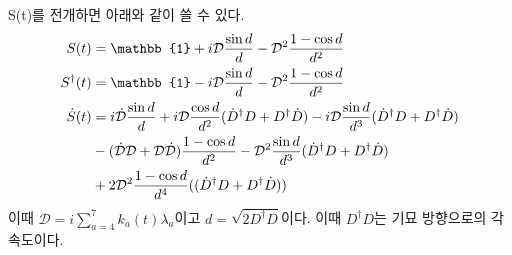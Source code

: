 \documentclass[superscriptaddress,
nofootinbib,byrevtex,fleqn,prd,12pt]{revtex4}
\begin{document}
S(t)를 전개하면 아래와 같이 쓸 수 있다.
\begin{align}
  S(t) & = \mathbb{1}+i\mathcal{D}\frac{\sin{d}}{d}-\mathcal{D}^2\frac{1-\cos{d}}{d^2} \label{eq:expansionS}\\
S^\dagger(t)& = \mathbb{1}-i\mathcal{D}\frac{\sin{d}}{d}-\mathcal{D}^2\frac{1-\cos{d}}{d^2}\label{eq:expationSD}\\
\dot{S}(t) &= i\dot{\mathcal{D}}\frac{\sin{d}}{d}+i\mathcal{D}\frac{\cos{d}}{d^2}(\dot{D}^\dagger D
+D^\dagger\dot{D})-i\mathcal{D}\frac{\sin{d}}{d^3}(\dot{D}^\dagger D+D^\dagger\dot{D})\cr
&-(\dot{\mathcal{D}}\mathcal{D}+\mathcal{D}\dot{\mathcal{D}})\frac{1-\cos{d}}{d^2}-\mathcal{D}^2\frac{\sin{d}}{d^3}(\dot{D}^\dagger D
+D^\dagger\dot{D})\cr
&+2\mathcal{D}^2\frac{1-\cos{d}}{d^4}((\dot{D}^\dagger D+D^\dagger\dot{D}))\label{eq:expansionDS}
\end{align}
이때 $\mathcal{D}= i \sum_{a=4}^{7} k_{a}(t) \lambda_{a}$이고 $d = \sqrt{2D^{\dagger}D}$이다. 이때 $D^{\dagger}D$는 기묘 방향으로의 각속도이다.
\end{document}
